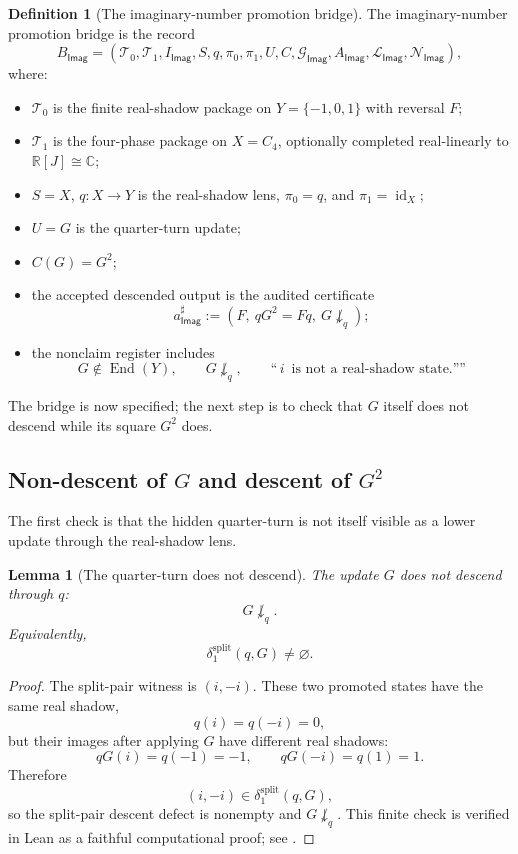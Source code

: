 \documentclass[11pt]{article}
\newcommand{\Imag}{\mathsf{Imag}}
\newcommand{\End}{\operatorname{End}}
\newcommand{\id}{\operatorname{id}}
\newtheorem{lemma}[theorem]{Lemma}
\theoremstyle{definition}
\newtheorem{definition}[theorem]{Definition}
\begin{document}
\begin{definition}[The imaginary-number promotion bridge]
\label{def:imag-promotion-bridge}
The imaginary-number promotion bridge is the record
\[
B_{\Imag}=(\mathcal T_0,\mathcal T_1,I_{\Imag},S,q,
\pi_0,
\pi_1,U,C,
\mathcal G_{\Imag},
A_{\Imag},
\mathcal L_{\Imag},
\mathcal N_{\Imag}),
\]
where:
\begin{itemize}
\item \(\mathcal T_0\) is the finite real-shadow package on \(Y=\{-1,0,1\}\) with reversal \(F\);
\item \(\mathcal T_1\) is the four-phase package on \(X=C_4\), optionally completed real-linearly to \(\mathbb R[J]\cong\mathbb C\);
\item \(S=X\), \(q:X\to Y\) is the real-shadow lens, \(\pi_0=q\), and \(\pi_1=\id_X\);
\item \(U=G\) is the quarter-turn update;
\item \(C(G)=G^2\);
\item the accepted descended output is the audited certificate
\[
a^\sharp_{\Imag}:=(F,\ qG^2=Fq,\ G\not\downarrow_q);
\]
\item the nonclaim register includes
\[
G\notin \End(Y),
\qquad
G\not\downarrow_q,
\qquad
\text{``}\,i\,\text{ is not a real-shadow state.''''}
\]
\end{itemize}
\end{definition}

The bridge is now specified; the next step is to check that \(G\) itself does
not descend while its square \(G^2\) does.

\subsection{Non-descent of \texorpdfstring{$G$}{G} and descent of \texorpdfstring{$G^2$}{G2}}
\label{subsec:imag-nondescent-descent}

The first check is that the hidden quarter-turn is not itself visible as a
lower update through the real-shadow lens.

\begin{lemma}[The quarter-turn does not descend]
\label{lem:imag-G-nondescends}
The update \(G\) does not descend through \(q\):
\[
G\not\downarrow_q.
\]
Equivalently,
\[
\delta^{\mathrm{split}}_1(q,G)\neq\varnothing.
\]
\end{lemma}

\begin{proof}
The split-pair witness is \((i,-i)\).  These two promoted states have the same
real shadow,
\[
q(i)=q(-i)=0,
\]
but their images after applying \(G\) have different real shadows:
\[
qG(i)=q(-1)=-1,
\qquad
qG(-i)=q(1)=1.
\]
Therefore
\[
(i,-i)\in\delta^{\mathrm{split}}_1(q,G),
\]
so the split-pair descent defect is nonempty and \(G\not\downarrow_q\).  This
finite check is verified in Lean as a faithful computational proof; see
.
\end{proof}
\end{document}
